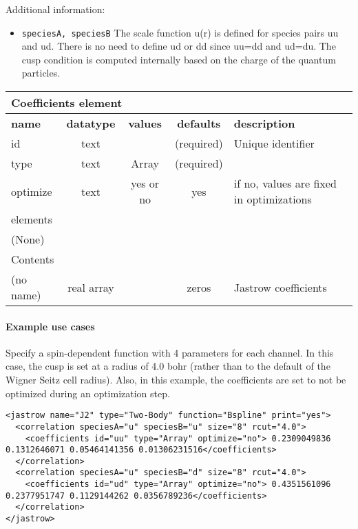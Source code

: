\FloatBarrier

Additional information:
\begin{itemize}
\item \texttt{speciesA, speciesB} The scale function u(r) is defined for species pairs uu and ud.  
There is no need to define ud or dd since uu=dd and ud=du.  The cusp condition is computed internally 
based on the charge of the quantum particles.
\end{itemize}

\begin{table}[h]
\begin{center}
\begin{tabular}{l c c c l }
\hline
\multicolumn{5}{l}{Coefficients element} \\
\hline
\bfseries name & \bfseries datatype & \bfseries values & \bfseries defaults & \bfseries description \\
\hline
id & text & & (required) & Unique identifier \\
type & text & Array & (required) & \\
optimize & text & yes or no & yes & if no, values are fixed in optimizations \\
\hline
\multicolumn{5}{l}{elements}\\ \hline
(None) & & & \\ \hline
\multicolumn{5}{l}{Contents}\\ \hline
 (no name) & real array & & zeros & Jastrow coefficients \\ \hline
\end{tabular}
\end{center}
\end{table}

\paragraph{Example use cases}
\label{sec:2bjsplineexamples}

Specify a spin-dependent function with 4 parameters for each channel.  In this case, the cusp is set at 
a radius of 4.0 bohr (rather than to the default of the Wigner Seitz cell radius).  Also, in this example,
the coefficients are set to not be optimized during an optimization step.

\begin{lstlisting}[style=XML]
<jastrow name="J2" type="Two-Body" function="Bspline" print="yes">
  <correlation speciesA="u" speciesB="u" size="8" rcut="4.0">
    <coefficients id="uu" type="Array" optimize="no"> 0.2309049836 0.1312646071 0.05464141356 0.01306231516</coefficients>
  </correlation>
  <correlation speciesA="u" speciesB="d" size="8" rcut="4.0">
    <coefficients id="ud" type="Array" optimize="no"> 0.4351561096 0.2377951747 0.1129144262 0.0356789236</coefficients>
  </correlation>
</jastrow>
\end{lstlisting}
